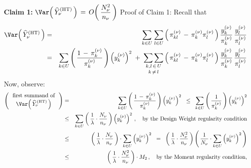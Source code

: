 \vskip 0.5cm
\proof
\vskip 0.1cm
\noindent
\textbf{Claim 1:}\quad
$
\Var\!\left(\,\widehat{Y}^{\textnormal{(HT)}}_{\nu}\,\right)
\,=\,
O\!\left(\,\dfrac{N_{\nu}^{2}}{n_{\nu}}\,\right)
$
\vskip 0.1cm
\noindent
Proof of Claim 1:\;\;
Recall that
\begin{eqnarray*}
\Var\!\left(\,\widehat{Y}^{\textnormal{(HT)}}_{\nu}\,\right)
& = &
    \underset{k \in U}{\sum}\;
    \underset{l \in U}{\sum}
    \left(\,
        \pi^{(\nu)}_{kl}
        \, - \,
        \pi^{(\nu)}_{k}\pi^{(\nu)}_{l}
        \,\right)
    \dfrac{y^{(\nu)}_{k}}{\pi^{(\nu)}_{k}}
    \,
    \dfrac{y^{(\nu)}_{l}}{\pi^{(\nu)}_{l}}
\\
& = &
    \underset{k \in U}{\sum}
    \left(\,
        \dfrac{
            1 \,-\, \pi^{(\nu)}_{k}
            }{
            \pi^{(\nu)}_{k}
            }
        \,\right)
    \left(y^{(\nu)}_{k}\right)^{2}
    \; + \;
    \underset{k\,\neq\,l}{\underset{k,l\,\in\,U}{\sum\sum}}
    \left(\,
        \pi^{(\nu)}_{kl}
        \, - \,
        \pi^{(\nu)}_{k}\pi^{(\nu)}_{l}
        \,\right)
    \dfrac{y^{(\nu)}_{k}}{\pi^{(\nu)}_{k}}
    \,
    \dfrac{y^{(\nu)}_{l}}{\pi^{(\nu)}_{l}}
\end{eqnarray*}
Now, observe:
\begin{eqnarray*}
\left(\,\begin{array}{c}
    \textnormal{first summand of}
    \\
    \Var\!\left(\,\widehat{Y}^{\textnormal{(HT)}}_{\nu}\,\right)
    \end{array}\,\right)
& = &
    \underset{k \in U}{\sum}
    \left(\,
        \dfrac{
            1 \,-\, \pi^{(\nu)}_{k}
            }{
            \pi^{(\nu)}_{k}
            }
        \,\right)
    \left(y^{(\nu)}_{k}\right)^{2}
\;\; \leq \;\;
    \underset{k \in U}{\sum}
    \left(\,
        \dfrac{ 1 }{ \pi^{(\nu)}_{k} }
        \,\right)
    \left(y^{(\nu)}_{k}\right)^{2}
\\
& \leq &
    \underset{k \in U}{\sum}
    \left(\,
        \dfrac{1}{\lambda} \cdot \dfrac{ N_{\nu} }{ n_{\nu} }
        \,\right)
    \left(y^{(\nu)}_{k}\right)^{2}\,,
    \quad
    \textnormal{by the Design Weight regularity condition}
\\
& \leq &
    \left(\,
        \dfrac{1}{\lambda} \cdot \dfrac{ N_{\nu} }{ n_{\nu} }
        \,\right)
    \cdot
    \underset{k \in U}{\sum}
    \left(y^{(\nu)}_{k}\right)^{2}
\;\; = \;\;
    \left(\,
        \dfrac{1}{\lambda} \cdot \dfrac{ N_{\nu}^{2} }{ n_{\nu} }
        \,\right)
    \left(\,
        \dfrac{1}{N_{\nu}}
            \cdot
        \underset{k \in U}{\sum}
        \left(y^{(\nu)}_{k}\right)^{2}
        \,\right)
\\
& \leq &
    \left(\,
        \dfrac{1}{\lambda} \cdot \dfrac{ N_{\nu}^{2} }{ n_{\nu} }
        \,\right)
    \cdot
    M_{2}\,,
    \quad
    \textnormal{by the Moment regularity condition},
\end{eqnarray*}
